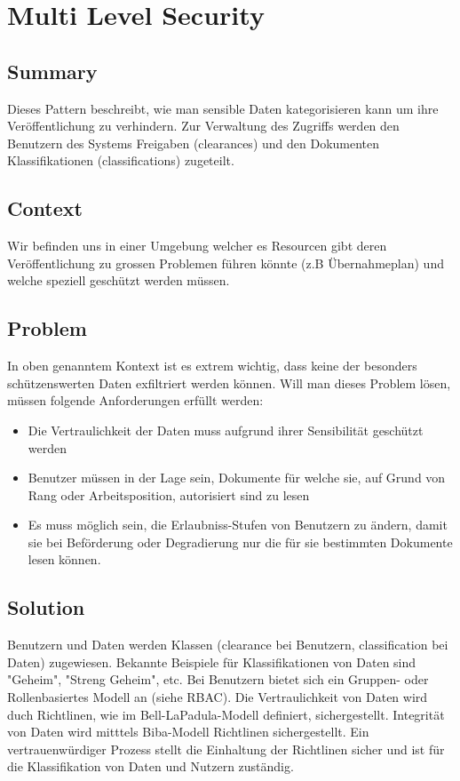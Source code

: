 \chapter{Multi Level Security}

\section{Summary}
Dieses Pattern beschreibt, wie man sensible Daten kategorisieren kann um ihre Veröffentlichung zu verhindern. Zur Verwaltung des Zugriffs werden den Benutzern des Systems Freigaben (clearances) und den Dokumenten Klassifikationen (classifications) zugeteilt.

\section{Context}
Wir befinden uns in einer Umgebung welcher es Resourcen gibt deren Veröffentlichung zu grossen Problemen führen könnte (z.B Übernahmeplan) und welche speziell geschützt werden müssen.

\section{Problem}
In oben genanntem Kontext ist es extrem wichtig, dass keine der besonders schützenswerten Daten exfiltriert werden können. Will man dieses Problem lösen, müssen folgende Anforderungen erfüllt werden:

\begin{itemize}
  \item Die Vertraulichkeit der Daten muss aufgrund ihrer Sensibilität geschützt werden
  \item Benutzer müssen in der Lage sein, Dokumente für welche sie, auf Grund von Rang oder Arbeitsposition, autorisiert sind zu lesen
  \item Es muss möglich sein, die Erlaubniss-Stufen von Benutzern zu ändern, damit sie bei Beförderung oder Degradierung nur die für sie bestimmten Dokumente lesen können.
\end{itemize}

\section{Solution}
Benutzern und Daten werden Klassen (clearance bei Benutzern, classification bei Daten) zugewiesen. Bekannte Beispiele für Klassifikationen von Daten sind "Geheim", "Streng Geheim", etc. Bei Benutzern bietet sich ein Gruppen- oder Rollenbasiertes Modell an (siehe RBAC). Die Vertraulichkeit von Daten wird duch Richtlinen, wie im Bell-LaPadula-Modell definiert, sichergestellt. Integrität von Daten wird mitttels Biba-Modell Richtlinen sichergestellt. Ein vertrauenwürdiger Prozess stellt die Einhaltung der Richtlinen sicher und ist für die Klassifikation von Daten und Nutzern zuständig.


